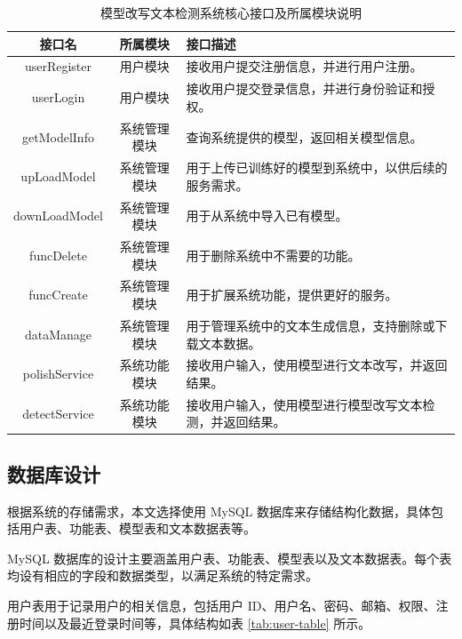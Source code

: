 \begin{table}[htb]
    \centering
    \caption{模型改写文本检测系统核心接口及所属模块说明}
    \label{tab:sys-interfaces}
    \begin{tabular}{ccl}
        \toprule
        \textbf{接口名} & \textbf{所属模块} & \textbf{接口描述} \\
        \midrule
        userRegister & 用户模块 & 接收用户提交注册信息，并进行用户注册。 \\
        userLogin & 用户模块 & 接收用户提交登录信息，并进行身份验证和授权。 \\
        getModelInfo & 系统管理模块 & 查询系统提供的模型，返回相关模型信息。 \\
        upLoadModel & 系统管理模块 & 用于上传已训练好的模型到系统中，以供后续的服务需求。 \\
        downLoadModel & 系统管理模块 & 用于从系统中导入已有模型。 \\
        funcDelete & 系统管理模块 & 用于删除系统中不需要的功能。 \\
        funcCreate & 系统管理模块 & 用于扩展系统功能，提供更好的服务。 \\
        dataManage & 系统管理模块 & 用于管理系统中的文本生成信息，支持删除或下载文本数据。 \\
        polishService & 系统功能模块 & 接收用户输入，使用模型进行文本改写，并返回结果。 \\
        detectService & 系统功能模块 & 接收用户输入，使用模型进行模型改写文本检测，并返回结果。 \\
        \bottomrule
    \end{tabular}
\end{table}

\subsection{数据库设计}
\label{sec:sys-db}

根据系统的存储需求，本文选择使用 MySQL 数据库来存储结构化数据，具体包括用户表、功能表、模型表和文本数据表等。

MySQL 数据库的设计主要涵盖用户表、功能表、模型表以及文本数据表。每个表均设有相应的字段和数据类型，以满足系统的特定需求。

用户表用于记录用户的相关信息，包括用户 ID、用户名、密码、邮箱、权限、注册时间以及最近登录时间等，具体结构如表 \ref{tab:user-table} 所示。

